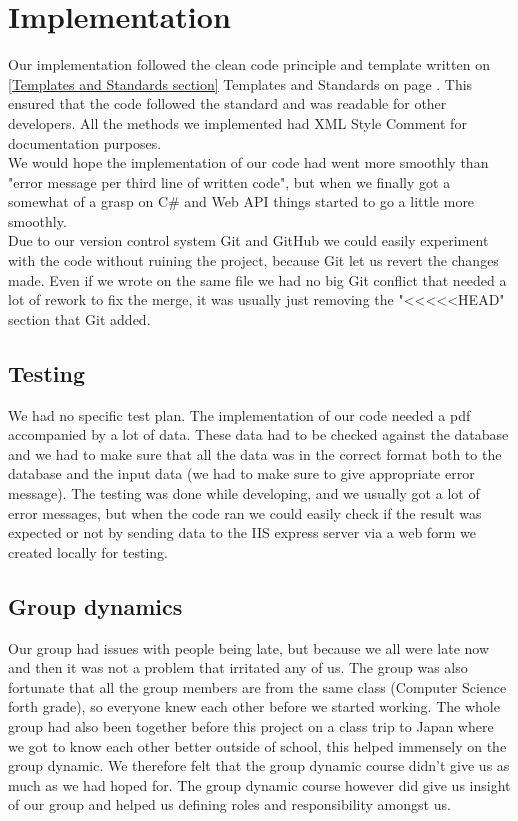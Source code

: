 \section{Implementation}
Our implementation followed the clean code principle and template written on \ref{Templates and Standards section} Templates and Standards on page \pageref{Templates and Standards section}. This ensured that the code followed the standard and was readable for other developers. All the methods we implemented had XML Style Comment for documentation purposes. \\
We would hope the implementation of our code had went more smoothly than "error message per third line of written code", but when we finally got a somewhat of a grasp on C\# and Web API things started to go a little more smoothly.\\
Due to our version control system Git and GitHub we could easily experiment with the code without ruining the project, because Git let us revert the changes made. Even if we wrote on the same file we had no big Git conflict that needed a lot of rework to fix the merge, it was usually just removing the "<<<<<HEAD" section that Git added.

\subsection{Testing}
We had no specific test plan. The implementation of our code needed a pdf accompanied by a lot of data. These data had to be checked against the database and we had to make sure that all the data was in the correct format both to the database and the input data (we had to make sure to give appropriate error message). The testing was done while developing, and we usually got a lot of error messages, but when the code ran we could easily check if the result was expected or not by sending data to the IIS express server via a web form we created locally for testing.

\subsection{Group dynamics}
Our group had issues with people being late, but because we all were late now and then it was not a problem that irritated any of us. The group was also fortunate that all the group members are from the same class (Computer Science forth grade), so everyone knew each other before we started working. The whole group had also been together before this project on a class trip to Japan where we got to know each other better outside of school, this helped immensely on the group dynamic. We therefore felt that the group dynamic course didn't give us as much as we had hoped for. The group dynamic course however did give us insight of our group and helped us defining roles and responsibility amongst us.



